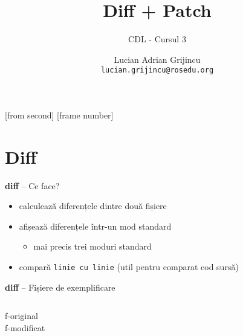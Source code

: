 \documentclass{beamer}
\title[Diff si Patch]{Diff + Patch}
\subtitle{CDL - Cursul 3}
\institute{ROSEdu}
\author{Lucian Adrian Grijincu \\ \texttt{lucian.grijincu@rosedu.org}}
\begin{document}
[from second]
[frame number]

\frame{\titlepage}

\frame{\tableofcontents}

\section{Diff}

\frame{\tableofcontents[currentsection]}

\begin{frame}{\textbf{diff} – Ce face?}
\begin{itemize} %
  \item calculează diferențele dintre două fișiere
  \item afișează diferențele într-un mod standard
    \begin{itemize}
    \item mai precis trei moduri standard
    \end{itemize}
  \item compară \texttt{linie cu linie} (util pentru comparat cod sursă)
\end{itemize}
\end{frame}


\begin{frame}{\textbf{diff} – Fișiere de exemplificare}
  \begin{columns}[t]
    \column{5cm}
    {\LARGE{f-original}}\\
    {\tt{\small }}
    \column{5cm}
    {\LARGE{f-modificat}}\\
    {\tt \small }
  \end{columns}
\end{frame}
\end{document}
